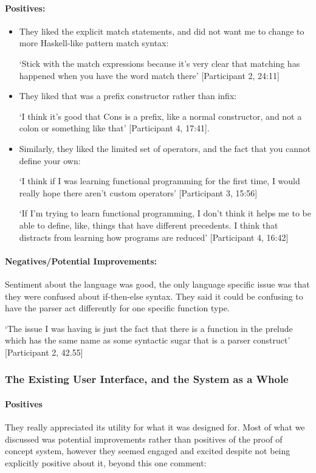 \paragraph{Positives:}
\begin{itemize}
    \item They liked the explicit match statements, and did not want me to change to more Haskell-like pattern match syntax: 
    
    `Stick with the match expressions because it's very clear that matching has happened when you have the word match there' [Participant 2, 24:11]
    \item They liked that  was a prefix constructor rather than infix: 
    
    `I think it's good that Cons is a prefix, like a normal constructor, and not a colon or
    something like that' [Participant 4, 17:41]. 
    \item Similarly, they liked the limited set of operators, and the fact that you cannot define your own: 
    
    `I think if I was learning functional programming for the first time, I would really hope there aren't custom operators' [Participant 3, 15:56]
    
    `If I'm trying to learn functional programming, I don't think it helps me to be able to define, like, things that have different precedents. I think that distracts from learning how programs are reduced' [Participant 4, 16:42]
\end{itemize}

\paragraph{Negatives/Potential Improvements:}
\label{ref:afg_ite} 
Sentiment about the language was good, the only language specific issue was that they were confused about if-then-else syntax. They said it could be confusing to have the parser act differently for one specific function type. 

`The issue I was having is just the fact that there is a function in the prelude which has the same name as some syntactic sugar that is a parser construct' [Participant 2, 42.55]

\subsubsection{The Existing User Interface, and the System as a Whole}
\paragraph{Positives}
They really appreciated its utility for what it was designed for. Most of what we discussed was potential improvements rather than positives of the proof of concept system, however they seemed engaged and excited despite not being explicitly positive about it, beyond this one comment:
    
